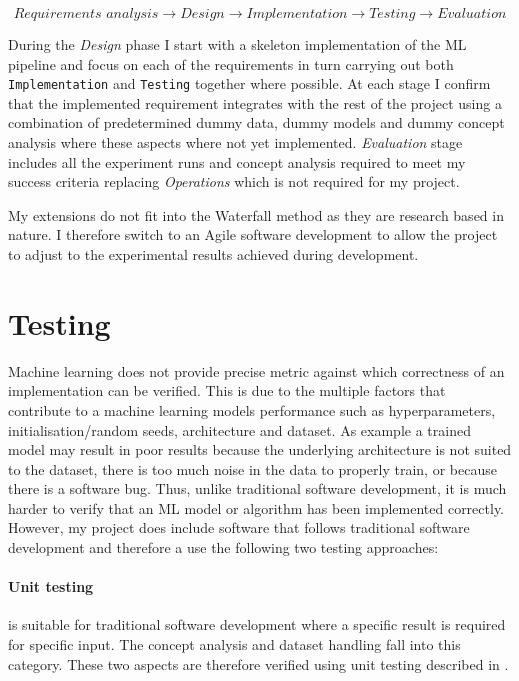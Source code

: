 \begin{equation*}
    \textit{Requirements analysis} \longrightarrow \textit{Design} \longrightarrow \textit{Implementation} \longrightarrow \textit{Testing} \longrightarrow \textit{Evaluation}
\end{equation*}

During the \textit{Design} phase I start with a skeleton implementation of the ML pipeline and focus on each of the requirements in turn carrying out both \texttt{Implementation} and \texttt{Testing} together where possible.
At each stage I confirm that the implemented requirement integrates with the rest of the project using a combination of predetermined dummy data, dummy models and dummy concept analysis where these aspects where not yet implemented.
\textit{Evaluation} stage includes all the experiment runs and concept analysis required to meet my success criteria replacing \textit{Operations} which is not required for my project.

My extensions do not fit into the Waterfall method as they are research based in nature. I therefore switch to an Agile software development \cite{beck2001manifesto} to allow the project to adjust to the experimental results achieved during development.

\section{Testing}
\label{sec:testing}


Machine learning does not provide precise metric against which correctness of an implementation can be verified.
This is due to the multiple factors that contribute to a machine learning models performance such as hyperparameters, initialisation/random seeds, architecture and dataset.
As example a trained model may result in poor results because the underlying architecture is not suited to the dataset, there is too much noise in the data to properly train, or because there is a software bug.
Thus, unlike traditional software development, it is much harder to verify that an ML model or algorithm has been implemented correctly.
However, my project does include software that follows traditional software development and therefore a use the following two testing approaches:

\paragraph{Unit testing}
is suitable for traditional software development where a specific result is required for specific input.
The concept analysis and dataset handling fall into this category.
These two aspects are therefore verified using unit testing described in .


